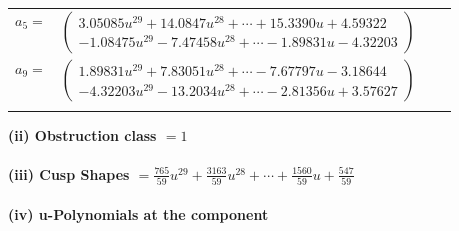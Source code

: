 \documentclass[1p]{elsarticle_modified}
\theoremstyle{definition}
\begin{document}
\begin{tabular}{m{7pt} m{180pt} m{7pt} m{180pt} }
\flushright $a_{5}=$&$\begin{pmatrix}3.05085 u^{29}+14.0847 u^{28}+\cdots+15.3390 u+4.59322\\-1.08475 u^{29}-7.47458 u^{28}+\cdots-1.89831 u-4.32203\end{pmatrix}$ \\
\flushright $a_{9}=$&$\begin{pmatrix}1.89831 u^{29}+7.83051 u^{28}+\cdots-7.67797 u-3.18644\\-4.32203 u^{29}-13.2034 u^{28}+\cdots-2.81356 u+3.57627\end{pmatrix}$\\&\end{tabular}
\flushleft \textbf{(ii) Obstruction class $= 1$}\\~\\
\flushleft \textbf{(iii) Cusp Shapes $= \frac{765}{59} u^{29}+\frac{3163}{59} u^{28}+\cdots+\frac{1560}{59} u+\frac{547}{59}$}\\~\\
\newpage\renewcommand{\arraystretch}{1}
\flushleft \textbf{(iv) u-Polynomials at the component}\newline \\
\end{document}
